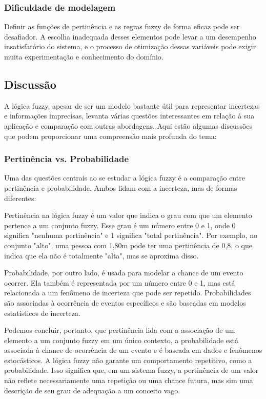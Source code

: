 \documentclass[12pt]{article}
\begin{document}
\subsubsection{Dificuldade de modelagem}
Definir as funções de pertinência e as regras fuzzy de forma eficaz pode ser desafiador. A escolha inadequada desses elementos pode levar a um desempenho insatisfatório do sistema, e o processo de otimização dessas variáveis pode exigir muita experimentação e conhecimento do domínio.

\subsection{Discussão}

A lógica fuzzy, apesar de ser um modelo bastante útil para representar incertezas e informações imprecisas, levanta várias questões interessantes em relação à sua aplicação e comparação com outras abordagens. Aqui estão algumas discussões que podem proporcionar uma compreensão mais profunda do tema:

\subsubsection{Pertinência vs. Probabilidade}

Uma das questões centrais ao se estudar a lógica fuzzy é a comparação entre pertinência e probabilidade. Ambos lidam com a incerteza, mas de formas diferentes:

Pertinência na lógica fuzzy é um valor que indica o grau com que um elemento pertence a um conjunto fuzzy. Esse grau é um número entre 0 e 1, onde 0 significa "nenhuma pertinência" e 1 significa "total pertinência". Por exemplo, no conjunto "alto", uma pessoa com 1,80m pode ter uma pertinência de 0,8, o que indica que ela não é totalmente "alta", mas se aproxima disso.

Probabilidade, por outro lado, é usada para modelar a chance de um evento ocorrer. Ela também é representada por um número entre 0 e 1, mas está relacionada a um fenômeno de incerteza que pode ser repetido. Probabilidades são associadas à ocorrência de eventos específicos e são baseadas em modelos estatísticos de incerteza.

Podemos concluir, portanto, que pertinência lida com a associação de um elemento a um conjunto fuzzy em um único contexto, a probabilidade está associada à chance de ocorrência de um evento e é baseada em dados e fenômenos estocásticos. A lógica fuzzy não garante um comportamento repetitivo, como a probabilidade. Isso significa que, em um sistema fuzzy, a pertinência de um valor não reflete necessariamente uma repetição ou uma chance futura, mas sim uma descrição de seu grau de adequação a um conceito vago.
\end{document}
